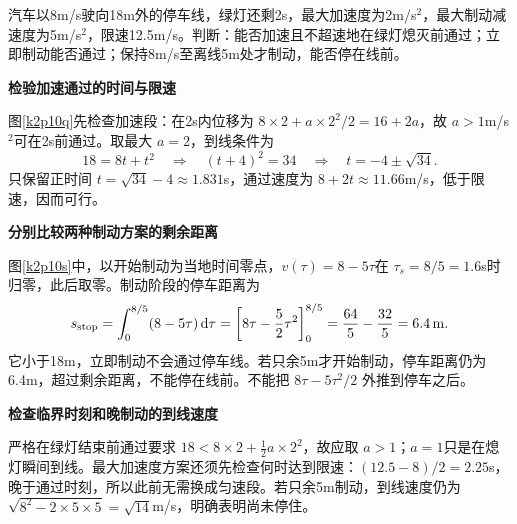 \begin{question}\begin{example}[绿灯剩余时间与停车距离]\label{k2p10}
汽车以8m/s驶向18m外的停车线，绿灯还剩2s，最大加速度为2m/s$^2$，最大制动减速度为5m/s$^2$，限速12.5m/s。判断：能否加速且不超速地在绿灯熄灭前通过；立即制动能否通过；保持8m/s至离线5m处才制动，能否停在线前。\end{example}
\end{question}
\begin{solution}\textbf{检验加速通过的时间与限速}\par\nobreak
图\ref{k2p10q}先检查加速段：在2s内位移为 $8\times2+a\times2^2/2=16+2a$，故 $a>1$m/s$^2$可在2s前通过。取最大 $a=2$，到线条件为
\[
 18=8t+t^2\quad\Longrightarrow\quad(t+4)^2=34
 \quad\Longrightarrow\quad t=-4\pm\sqrt{34}.
\]
只保留正时间 $t=\sqrt{34}-4\approx1.831$s，通过速度为 $8+2t\approx11.66$m/s，低于限速，因而可行。



\par\medskip{}\noindent\textbf{分别比较两种制动方案的剩余距离}\par\nobreak
图\ref{k2p10s}中，以开始制动为当地时间零点，$v(\tau)=8-5\tau$在 $\tau_s=8/5=1.6$s时归零，此后取零。制动阶段的停车距离为
\[
 s_{\rm stop}=\int_0^{8/5}(8-5\tau)\mathop{}\!\mathrm d\tau
 =\left[8\tau-\frac52\tau^2\right]_0^{8/5}
 =\frac{64}{5}-\frac{32}{5}=6.4\,\mathrm m.
\]
它小于18m，立即制动不会通过停车线。若只余5m才开始制动，停车距离仍为6.4m，超过剩余距离，不能停在线前。不能把 $8\tau-5\tau^2/2$ 外推到停车之后。



\par\medskip{}\noindent\textbf{检查临界时刻和晚制动的到线速度}\par\nobreak
严格在绿灯结束前通过要求 $18<8\times2+\tfrac12a\times2^2$，故应取 $a>1$；$a=1$只是在熄灯瞬间到线。最大加速度方案还须先检查何时达到限速：$(12.5-8)/2=2.25$s，晚于通过时刻，所以此前无需换成匀速段。若只余5m制动，到线速度仍为 $\sqrt{8^2-2\times5\times5}=\sqrt{14}$m/s，明确表明尚未停住。\end{solution}

